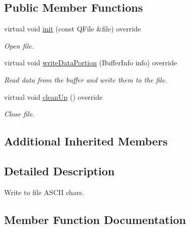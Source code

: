 \subsection*{Public Member Functions}
\begin{DoxyCompactItemize}
\item 
virtual void \hyperlink{classAsciiTransmissionWriter_af9a2b271e8e051b7dbd266ba8207b4e7}{init} (const Q\+File \&file) override
\begin{DoxyCompactList}\small\item\em Open file. \end{DoxyCompactList}\item 
virtual void \hyperlink{classAsciiTransmissionWriter_a49127d2b72eceeb35211d91601434a27}{write\+Data\+Portion} (Buffer\+Info info) override
\begin{DoxyCompactList}\small\item\em Read data from the buffer and write them to the file. \end{DoxyCompactList}\item 
\mbox{\label{classAsciiTransmissionWriter_ae20c17e44f883f235646a34858cf1d7f}} 
virtual void \hyperlink{classAsciiTransmissionWriter_ae20c17e44f883f235646a34858cf1d7f}{clean\+Up} () override
\begin{DoxyCompactList}\small\item\em Close file. \end{DoxyCompactList}\end{DoxyCompactItemize}
\subsection*{Additional Inherited Members}


\subsection{Detailed Description}
Write to file A\+S\+C\+II chars. 

\subsection{Member Function Documentation}
\mbox{\label{classAsciiTransmissionWriter_af9a2b271e8e051b7dbd266ba8207b4e7}} 

